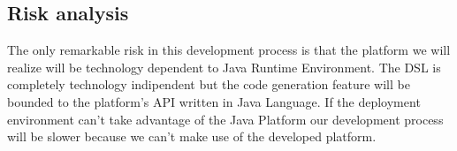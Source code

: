 \subsection{Risk analysis}
The only remarkable risk in this development process is that the platform we will realize will be technology dependent to Java Runtime Environment. The DSL is completely technology indipendent but the code generation feature will be bounded to the platform’s API written in Java Language. If the deployment environment can’t take advantage of the Java Platform our development process will be slower because we can’t make use of the developed platform.